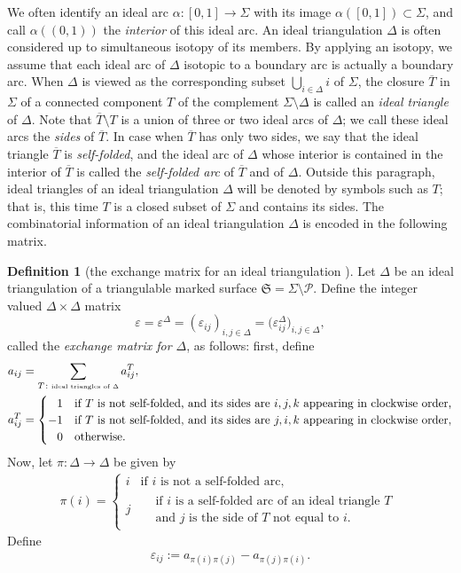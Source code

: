 \documentclass[pdftex]{sigma}
\numberwithin{equation}{section}
\theoremstyle{definition}
\newtheorem{Definition}[Theorem]{Definition}
\newcommand{\ol}[1]{\overline{#1}}
\begin{document}
We often identify an ideal arc $\alpha \colon [0,1]\to\Sigma$ with its image $\alpha([0,1]) \subset \Sigma$, and call $\alpha((0,1))$ the {\em interior} of this ideal arc. An ideal triangulation $\Delta$ is often considered up to simultaneous isotopy of its members. By applying an isotopy, we assume that each ideal arc of $\Delta$ isotopic to a boundary arc is actually a boundary arc. When $\Delta$ is viewed as the corresponding subset $\bigcup_{i \in \Delta} i$ of $\Sigma$, the closure $\ol{T}$ in $\Sigma$ of a connected component $T$ of the complement $\Sigma \setminus \Delta$ is called an {\em ideal triangle} of $\Delta$. Note that $\ol{T} \setminus T$ is a union of three or two ideal arcs of $\Delta$; we call these ideal arcs the {\em sides} of $\ol{T}$. In case when $\ol{T}$ has only two sides, we say that the ideal triangle $\ol{T}$ is {\em self-folded}, and the ideal arc of $\Delta$ whose interior is contained in the interior of $\ol{T}$ is called the {\em self-folded arc} of $\ol{T}$ and of $\Delta$. Outside this paragraph, ideal triangles of an ideal triangulation $\Delta$ will be denoted by symbols such as $T$; that is, this time $T$ is a closed subset of $\Sigma$ and contains its sides. The combinatorial information of an ideal triangulation $\Delta$ is encoded in the following matrix.
\begin{Definition}[the exchange matrix for an ideal triangulation \cite{FST}]
\label{def:varepsilon_Delta}
Let $\Delta$ be an ideal triangulation of a triangulable marked surface $\mathfrak{S} = \Sigma \setminus \mathcal{P}$. Define the integer valued $\Delta\times \Delta$ matrix
\[
\varepsilon = \varepsilon^\Delta = (\varepsilon_{ij})_{i,j\in \Delta} = \bigl(\varepsilon^\Delta_{ij}\bigr)_{i,j\in \Delta},
\]
called the {\em exchange matrix for $\Delta$}, as follows: first, define
\begin{align*}
a_{ij} & = \sum_{T\colon \mbox{\tiny ideal triangles of $\Delta$}} a^T_{ij}, \\
a^T_{ij} & = \begin{cases}
 \hphantom{-}1 & \mbox{if $T$ is not self-folded, and its sides are $i,j,k$ appearing in clockwise order,} \\
 -1 & \mbox{if $T$ is not self-folded, and its sides are $j,i,k$ appearing in clockwise order,} \\
 \hphantom{-}0 & \mbox{otherwise}.
 \end{cases}
\end{align*}
Now, let $\pi \colon \Delta \to \Delta$ be given by
\begin{align}
\label{eq:pi}
\pi(i) = \begin{cases}
 i & \mbox{if $i$ is not a self-folded arc}, \\
 j & \begin{aligned} & \text{if $i$ is a self-folded arc of an ideal triangle $T$} \\
 & \text{and $j$ is the side of $T$ not equal to $i$}.\end{aligned}
 \end{cases}
\end{align}
Define
\begin{align*}
\varepsilon_{ij} := a_{\pi(i) \pi(j)} - a_{\pi(j) \pi(i)}.
\end{align*}
\end{Definition}
\end{document}
